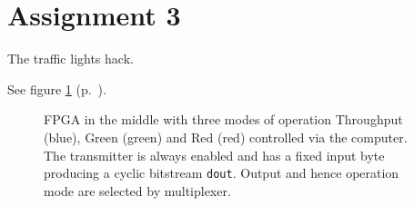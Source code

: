 \section*{Assignment 3}
The traffic lights hack.

See figure \ref{as3-schematic} (p.~\pageref{as3-schematic}).

\begin{figure}[htb]
    \begin{center}
        
        \caption{FPGA in the middle with three modes of operation \textsf{Throughput} (blue), \textsf{Green} (green) and \textsf{Red} (red) controlled via the computer. The transmitter is always enabled and has a fixed input byte producing a cyclic bitstream \texttt{dout}. Output and hence operation mode are selected by multiplexer.}
        \label{as3-schematic}
    \end{center}
\end{figure}
